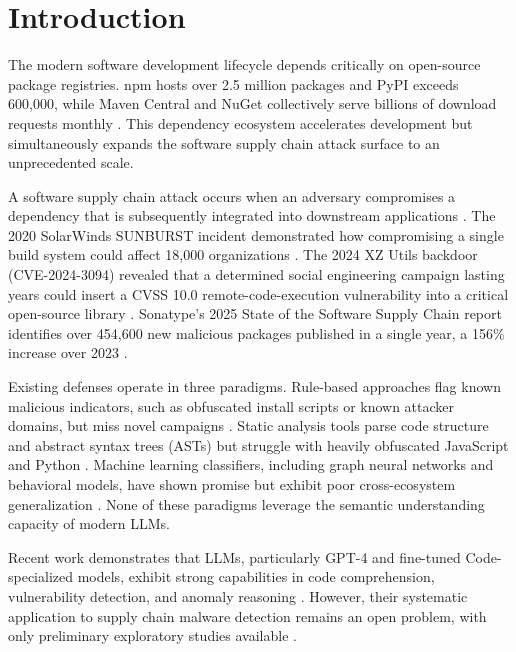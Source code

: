 \documentclass[conference]{IEEEtran}
\begin{document}
\section{Introduction}
\label{sec:intro}

The modern software development lifecycle depends critically on open-source package registries. npm hosts over 2.5 million packages and PyPI exceeds 600,000, while Maven Central and NuGet collectively serve billions of download requests monthly \cite{sonatype2025report}. This dependency ecosystem accelerates development but simultaneously expands the software supply chain attack surface to an unprecedented scale.

A software supply chain attack occurs when an adversary compromises a dependency that is subsequently integrated into downstream applications \cite{ohm2022backstabber}. The 2020 SolarWinds SUNBURST incident demonstrated how compromising a single build system could affect 18,000 organizations \cite{peisert2021solarwinds}. The 2024 XZ Utils backdoor (CVE-2024-3094) revealed that a determined social engineering campaign lasting years could insert a CVSS 10.0 remote-code-execution vulnerability into a critical open-source library \cite{xzutils2025springer}. Sonatype's 2025 State of the Software Supply Chain report identifies over 454,600 new malicious packages published in a single year, a 156\% increase over 2023 \cite{sonatype2025report}.

Existing defenses operate in three paradigms. Rule-based approaches flag known malicious indicators, such as obfuscated install scripts or known attacker domains, but miss novel campaigns \cite{duan2020measuring}. Static analysis tools parse code structure and abstract syntax trees (ASTs) but struggle with heavily obfuscated JavaScript and Python \cite{crosslang2023acsac}. Machine learning classifiers, including graph neural networks and behavioral models, have shown promise but exhibit poor cross-ecosystem generalization \cite{twobirdstone2024tosem}. None of these paradigms leverage the semantic understanding capacity of modern LLMs.

Recent work demonstrates that LLMs, particularly GPT-4 and fine-tuned Code-specialized models, exhibit strong capabilities in code comprehension, vulnerability detection, and anomaly reasoning \cite{llmvulndetect2024icse,chatgptvuln2024tosem}. However, their systematic application to supply chain malware detection remains an open problem, with only preliminary exploratory studies available \cite{llmsupplychain2023scored}.
\end{document}
